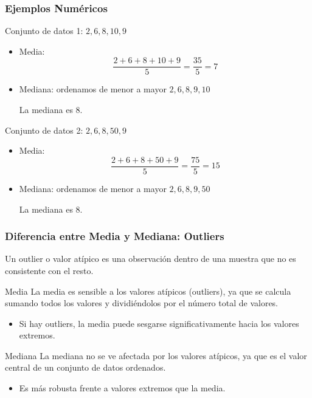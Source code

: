 \documentclass[aspectratio=169,12pt]{beamer}
\begin{document}
\begin{frame}
\frametitle{Ejemplos Numéricos}
\begin{block}{Conjunto de datos 1: $2, 6, 8, 10, 9$}
\begin{itemize}
    \item Media:
    \[ \frac{2+6+8+10+9}{5} = \frac{35}{5} = 7 \]
    \item Mediana: ordenamos de menor a mayor $2, 6, 8, 9, 10$
    
    La mediana es 8.
\end{itemize}
\end{block}

\begin{block}{Conjunto de datos 2: $2, 6, 8, 50, 9$}
\begin{itemize}
    \item Media:
    \[ \frac{2+6+8+50+9}{5} = \frac{75}{5} = 15 \]
    \item Mediana: ordenamos de menor a mayor $2, 6, 8, 9, 50$
    
    La mediana es 8.
\end{itemize}
\end{block}
\end{frame}

\begin{frame}
\frametitle{Diferencia entre Media y Mediana: Outliers}

Un outlier o valor atípico es una observación dentro de una muestra que no es consistente con el resto.

\begin{block}{Media}
La media es sensible a los valores atípicos (outliers), ya que se calcula sumando todos los valores y dividiéndolos por el número total de valores.
\begin{itemize}
    \item Si hay outliers, la media puede sesgarse significativamente hacia los valores extremos.
\end{itemize}
\end{block}

\begin{block}{Mediana}
La mediana no se ve afectada por los valores atípicos, ya que es el valor central de un conjunto de datos ordenados.
\begin{itemize}
    \item Es más robusta frente a valores extremos que la media.
\end{itemize}
\end{block}
\end{frame}
\end{document}
